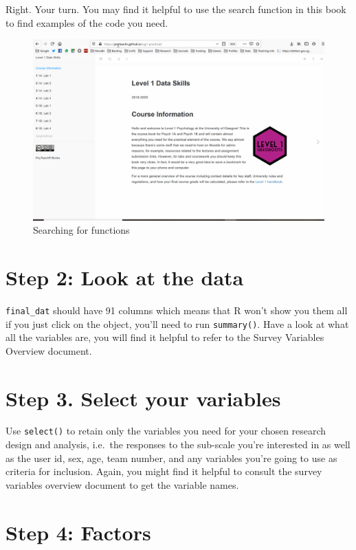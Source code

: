 \documentclass[
  oneside]{book}
\begin{document}
Right. Your turn. You may find it helpful to use the search function in this book to find examples of the code you need.

\begin{figure}

{\centering \includegraphics[width=0.75\linewidth,height=0.75\textheight]{./images/searching} 

}

\caption{Searching for functions}\label{fig:unnamed-chunk-2}
\end{figure}

\hypertarget{step-2-look-at-the-data}{%
\section{Step 2: Look at the data}\label{step-2-look-at-the-data}}

\texttt{final\_dat} should have 91 columns which means that R won't show you them all if you just click on the object, you'll need to run \texttt{summary()}. Have a look at what all the variables are, you will find it helpful to refer to the Survey Variables Overview document.

\hypertarget{step-3.-select-your-variables}{%
\section{Step 3. Select your variables}\label{step-3.-select-your-variables}}

Use \texttt{select()} to retain only the variables you need for your chosen research design and analysis, i.e.~the responses to the sub-scale you're interested in as well as the user id, sex, age, team number, and any variables you're going to use as criteria for inclusion. Again, you might find it helpful to consult the survey variables overview document to get the variable names.

\hypertarget{step-4-factors}{%
\section{Step 4: Factors}\label{step-4-factors}}
\end{document}
